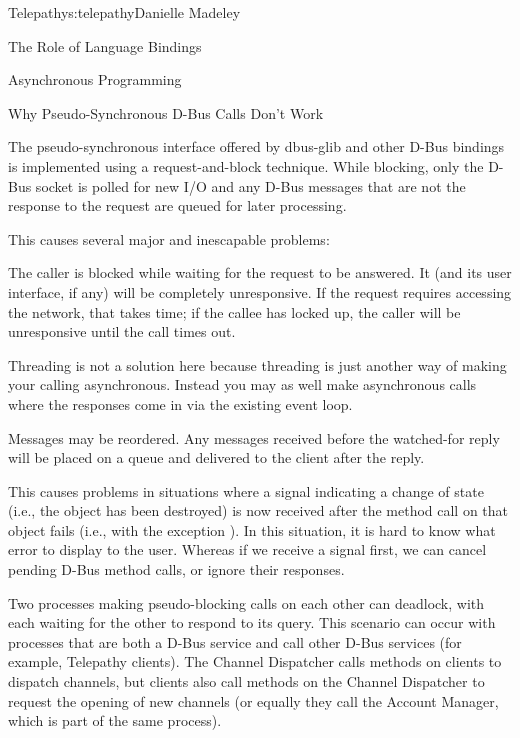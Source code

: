 \begin{aosachapter}{Telepathy}{s:telepathy}{Danielle Madeley}
\begin{aosasect1}{The Role of Language Bindings}
\begin{aosasect2}{Asynchronous Programming}
\begin{aosabox}{Why Pseudo-Synchronous D-Bus Calls Don't Work}

The pseudo-synchronous interface offered by dbus-glib and other D-Bus
bindings is implemented using a request-and-block technique. While
blocking, only the D-Bus socket is polled for new I/O and any D-Bus
messages that are not the response to the request are queued for later
processing.

This causes several major and inescapable problems:

\begin{aosaitemize}

  \item The caller is blocked while waiting for the request to be
    answered.  It (and its user interface, if any) will be completely
    unresponsive. If the request requires accessing the network, that
    takes time; if the callee has locked up, the caller will be
    unresponsive until the call times out.

    Threading is not a solution here because threading is just another
    way of making your calling asynchronous. Instead you may as well
    make asynchronous calls where the responses come in via the
    existing event loop.

  \item Messages may be reordered. Any messages received before the
    watched-for reply will be placed on a queue and delivered to the
    client after the reply.

    This causes problems in situations where a signal indicating a
    change of state (i.e., the object has been destroyed) is now
    received after the method call on that object fails (i.e., with
    the exception ).  In this situation, it is
    hard to know what error to display to the user.  Whereas if we
    receive a signal first, we can cancel pending D-Bus method calls,
    or ignore their responses.

  \item Two processes making pseudo-blocking calls on each other can
    deadlock, with each waiting for the other to respond to its query.
    This scenario can occur with processes that are both a D-Bus
    service and call other D-Bus services (for example, Telepathy
    clients). The Channel Dispatcher calls methods on clients to
    dispatch channels, but clients also call methods on the Channel
    Dispatcher to request the opening of new channels (or equally they
    call the Account Manager, which is part of the same process).


\end{aosaitemize}
\end{aosabox}
\end{aosasect2}
\end{aosasect1}
\end{aosachapter}
